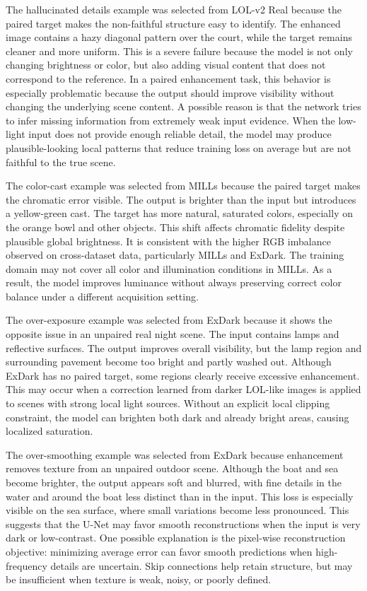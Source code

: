 

The hallucinated details example was selected from LOL-v2 Real because the paired target makes the non-faithful structure easy to identify. The enhanced image contains a hazy diagonal pattern over the court, while the target remains cleaner and more uniform. This is a severe failure because the model is not only changing brightness or color, but also adding visual content that does not correspond to the reference. In a paired enhancement task, this behavior is especially problematic because the output should improve visibility without changing the underlying scene content. A possible reason is that the network tries to infer missing information from extremely weak input evidence. When the low-light input does not provide enough reliable detail, the model may produce plausible-looking local patterns that reduce training loss on average but are not faithful to the true scene.

The color-cast example was selected from MILLs because the paired target makes the chromatic error visible. The output is brighter than the input but introduces a yellow-green cast. The target has more natural, saturated colors, especially on the orange bowl and other objects. This shift affects chromatic fidelity despite plausible global brightness. It is consistent with the higher RGB imbalance observed on cross-dataset data, particularly MILLs and ExDark. The training domain may not cover all color and illumination conditions in MILLs. As a result, the model improves luminance without always preserving correct color balance under a different acquisition setting.

The over-exposure example was selected from ExDark because it shows the opposite issue in an unpaired real night scene. The input contains lamps and reflective surfaces. The output improves overall visibility, but the lamp region and surrounding pavement become too bright and partly washed out. Although ExDark has no paired target, some regions clearly receive excessive enhancement. This may occur when a correction learned from darker LOL-like images is applied to scenes with strong local light sources. Without an explicit local clipping constraint, the model can brighten both dark and already bright areas, causing localized saturation.

The over-smoothing example was selected from ExDark because enhancement removes texture from an unpaired outdoor scene. Although the boat and sea become brighter, the output appears soft and blurred, with fine details in the water and around the boat less distinct than in the input. This loss is especially visible on the sea surface, where small variations become less pronounced. This suggests that the U-Net may favor smooth reconstructions when the input is very dark or low-contrast. One possible explanation is the pixel-wise reconstruction objective: minimizing average error can favor smooth predictions when high-frequency details are uncertain. Skip connections help retain structure, but may be insufficient when texture is weak, noisy, or poorly defined.

